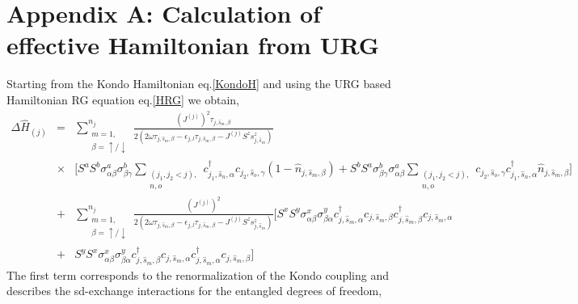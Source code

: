 \documentclass[aps,prb,preprint,groupedaddress]{revtex4-2}
\begin{document}
\section*{Appendix A: Calculation of effective Hamiltonian from URG}\label{Appendix-A}
\par\noindent
Starting from the Kondo Hamiltonian eq.\eqref{KondoH} and using the URG based Hamiltonian RG equation eq.\eqref{HRG} we obtain,
\begin{eqnarray}
\Delta\hat{H}_{(j)} &=& \sum_{\substack{m=1,\\ \beta=\uparrow/\downarrow}}^{n_{j}}\frac{(J^{(j)})^{2}\tau_{j,\hat{s}_{m},\beta}}{2(2\omega\tau_{j,\hat{s}_{m},\beta} - \epsilon_{j,l}\tau_{j,\hat{s}_{m},\beta}-J^{(j)}S^{z}s^{z}_{j,\hat{s}_{m}})}\nonumber\\
&\times & \bigg[S^{a}S^{b}\sigma^{a}_{\alpha\beta}\sigma^{b}_{\beta\gamma} \sum_{\substack{(j_{1},j_{2}< j),\\ n,o}}c^{\dagger}_{j_{1},\hat{s}_{n},\alpha}c_{j_{2},\hat{s}_{o},\gamma}(1-\hat{n}_{j,\hat{s}_{m},\beta})+S^{b}S^{a}\sigma^{b}_{\beta\gamma}\sigma^{a}_{\alpha\beta} \sum_{\substack{(j_{1},j_{2}<j),\\ n,o}}c_{j_{2},\hat{s}_{o},\gamma}c^{\dagger}_{j_{1},\hat{s}_{n},\alpha}\hat{n}_{j,\hat{s}_{m},\beta}\bigg]\nonumber\\
&+&\sum_{\substack{m=1,\\ \beta=\uparrow/\downarrow}}^{n_{j}}\frac{(J^{(j)})^{2}}{2(2\omega\tau_{j,\hat{s}_{m},\beta} - \epsilon_{j,l}\tau_{j,\hat{s}_{m},\beta}-J^{(j)}S^{z}s^{z}_{j,\hat{s}_{m}})}\bigg[S^{x}S^{y}\sigma^{x}_{\alpha\beta}\sigma^{y}_{\beta\alpha}c^{\dagger}_{j,\hat{s}_{m},\alpha}c_{j,\hat{s}_{m},\beta}c^{\dagger}_{j,\hat{s}_{m},\beta}c_{j,\hat{s}_{m},\alpha}\nonumber\\
&+&S^{y}S^{x}\sigma^{x}_{\alpha\beta}\sigma^{y}_{\beta\alpha}c^{\dagger}_{j,\hat{s}_{m},\beta}c_{j,\hat{s}_{m},\alpha}c^{\dagger}_{j,\hat{s}_{m},\alpha}c_{j,\hat{s}_{m},\beta}\bigg]
\end{eqnarray}
The first term corresponds to the renormalization of the Kondo coupling and describes the sd-exchange interactions for the entangled degrees of freedom,
\end{document}
